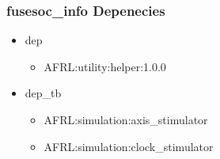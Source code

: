 \subsubsection{fusesoc\_info Depenecies}
\begin{itemize}
\item dep
	\begin{itemize}
	\item AFRL:utility:helper:1.0.0
	\end{itemize}
\item dep\_tb
	\begin{itemize}
	\item AFRL:simulation:axis\_stimulator
	\item AFRL:simulation:clock\_stimulator
	\end{itemize}
\end{itemize}
